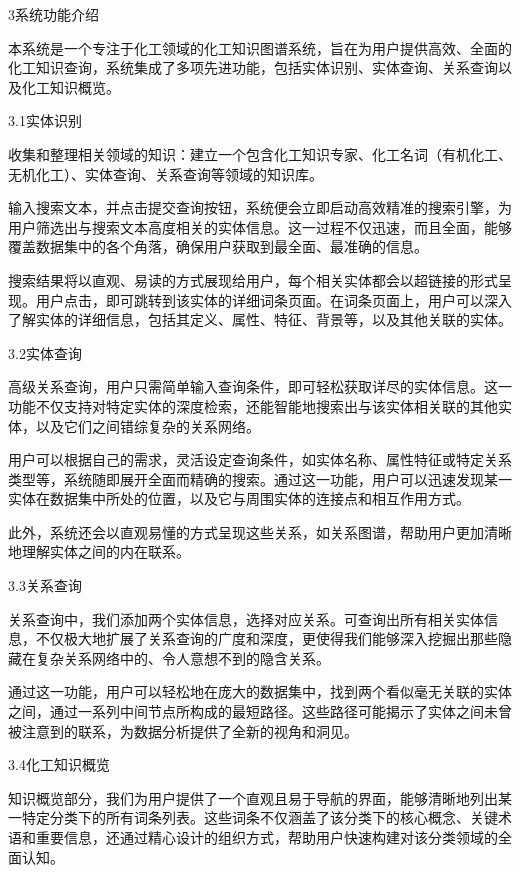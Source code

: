 3系统功能介绍

本系统是一个专注于化工领域的化工知识图谱系统，旨在为用户提供高效、全面的化工知识查询，系统集成了多项先进功能，包括实体识别、实体查询、关系查询以及化工知识概览。

3.1实体识别

收集和整理相关领域的知识：建立一个包含化工知识专家、化工名词（有机化工、无机化工）、实体查询、关系查询等领域的知识库。

输入搜索文本，并点击提交查询按钮，系统便会立即启动高效精准的搜索引擎，为用户筛选出与搜索文本高度相关的实体信息。这一过程不仅迅速，而且全面，能够覆盖数据集中的各个角落，确保用户获取到最全面、最准确的信息。



搜索结果将以直观、易读的方式展现给用户，每个相关实体都会以超链接的形式呈现。用户点击，即可跳转到该实体的详细词条页面。在词条页面上，用户可以深入了解实体的详细信息，包括其定义、属性、特征、背景等，以及其他关联的实体。



3.2实体查询

高级关系查询，用户只需简单输入查询条件，即可轻松获取详尽的实体信息。这一功能不仅支持对特定实体的深度检索，还能智能地搜索出与该实体相关联的其他实体，以及它们之间错综复杂的关系网络。

用户可以根据自己的需求，灵活设定查询条件，如实体名称、属性特征或特定关系类型等，系统随即展开全面而精确的搜索。通过这一功能，用户可以迅速发现某一实体在数据集中所处的位置，以及它与周围实体的连接点和相互作用方式。

此外，系统还会以直观易懂的方式呈现这些关系，如关系图谱，帮助用户更加清晰地理解实体之间的内在联系。



3.3关系查询

关系查询中，我们添加两个实体信息，选择对应关系。可查询出所有相关实体信息，不仅极大地扩展了关系查询的广度和深度，更使得我们能够深入挖掘出那些隐藏在复杂关系网络中的、令人意想不到的隐含关系。

通过这一功能，用户可以轻松地在庞大的数据集中，找到两个看似毫无关联的实体之间，通过一系列中间节点所构成的最短路径。这些路径可能揭示了实体之间未曾被注意到的联系，为数据分析提供了全新的视角和洞见。



3.4化工知识概览

知识概览部分，我们为用户提供了一个直观且易于导航的界面，能够清晰地列出某一特定分类下的所有词条列表。这些词条不仅涵盖了该分类下的核心概念、关键术语和重要信息，还通过精心设计的组织方式，帮助用户快速构建对该分类领域的全面认知。



